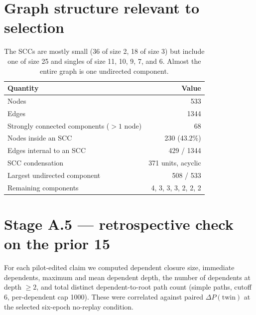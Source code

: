 \documentclass[11pt]{article}
\begin{document}
\section{Graph structure relevant to selection}

\begin{table}[h]
\centering
\begin{tabular}{lr}
\toprule
Quantity & Value \\
\midrule
Nodes & 533 \\
Edges & 1344 \\
Strongly connected components ($>1$ node) & 68 \\
Nodes inside an SCC & 230 (43.2\%) \\
Edges internal to an SCC & 429 / 1344 \\
SCC condensation & 371 units, acyclic \\
Largest undirected component & 508 / 533 \\
Remaining components & 4, 3, 3, 3, 2, 2, 2 \\
\bottomrule
\end{tabular}
\caption{The SCCs are mostly small (36 of size 2, 18 of size 3) but include one
of size 25 and singles of size 11, 10, 9, 7, and 6. Almost the entire graph is
one undirected component.}
\end{table}

\section{Stage A.5 --- retrospective check on the prior 15}

For each pilot-edited claim we computed dependent closure size, immediate
dependents, maximum and mean dependent depth, the number of dependents at depth
$\geq 2$, and total distinct dependent-to-root path count (simple paths, cutoff
6, per-dependent cap 1000). These were correlated against paired
$\Delta P(\mathrm{twin})$ at the selected six-epoch no-replay condition.
\end{document}
